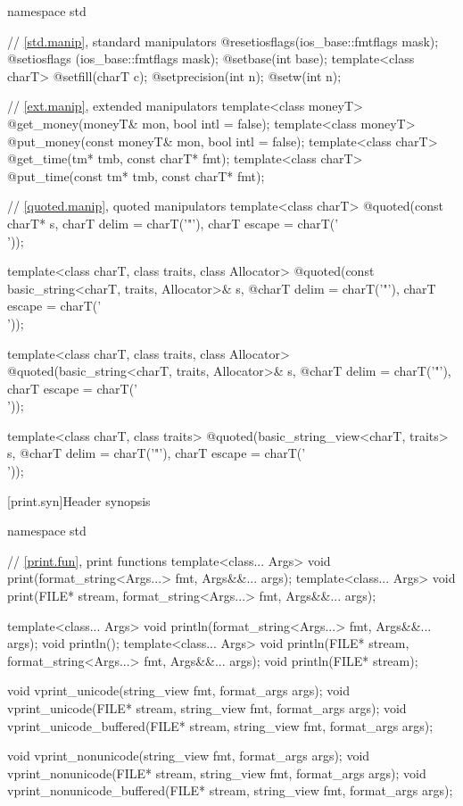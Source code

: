 %
\begin{codeblock}
namespace std {
  // \ref{std.manip}, standard manipulators
  @\unspec@ resetiosflags(ios_base::fmtflags mask);
  @\unspec@ setiosflags  (ios_base::fmtflags mask);
  @\unspec@ setbase(int base);
  template<class charT> @\unspec@ setfill(charT c);
  @\unspec@ setprecision(int n);
  @\unspec@ setw(int n);

  // \ref{ext.manip}, extended manipulators
  template<class moneyT> @\unspec@ get_money(moneyT& mon, bool intl = false);
  template<class moneyT> @\unspec@ put_money(const moneyT& mon, bool intl = false);
  template<class charT> @\unspec@ get_time(tm* tmb, const charT* fmt);
  template<class charT> @\unspec@ put_time(const tm* tmb, const charT* fmt);

  // \ref{quoted.manip}, quoted manipulators
  template<class charT>
    @\unspec@ quoted(const charT* s, charT delim = charT('"'), charT escape = charT('\\'));

  template<class charT, class traits, class Allocator>
    @\unspec@ quoted(const basic_string<charT, traits, Allocator>& s,
    @\itcorr@                   charT delim = charT('"'), charT escape = charT('\\'));

  template<class charT, class traits, class Allocator>
    @\unspec@ quoted(basic_string<charT, traits, Allocator>& s,
    @\itcorr@                   charT delim = charT('"'), charT escape = charT('\\'));

  template<class charT, class traits>
    @\unspec@ quoted(basic_string_view<charT, traits> s,
    @\itcorr@                   charT delim = charT('"'), charT escape = charT('\\'));
}
\end{codeblock}

[print.syn]{Header  synopsis}

%
\begin{codeblock}
namespace std {
  // \ref{print.fun}, print functions
  template<class... Args>
    void print(format_string<Args...> fmt, Args&&... args);
  template<class... Args>
    void print(FILE* stream, format_string<Args...> fmt, Args&&... args);

  template<class... Args>
    void println(format_string<Args...> fmt, Args&&... args);
  void println();
  template<class... Args>
    void println(FILE* stream, format_string<Args...> fmt, Args&&... args);
  void println(FILE* stream);

  void vprint_unicode(string_view fmt, format_args args);
  void vprint_unicode(FILE* stream, string_view fmt, format_args args);
  void vprint_unicode_buffered(FILE* stream, string_view fmt, format_args args);

  void vprint_nonunicode(string_view fmt, format_args args);
  void vprint_nonunicode(FILE* stream, string_view fmt, format_args args);
  void vprint_nonunicode_buffered(FILE* stream, string_view fmt, format_args args);
}
\end{codeblock}

